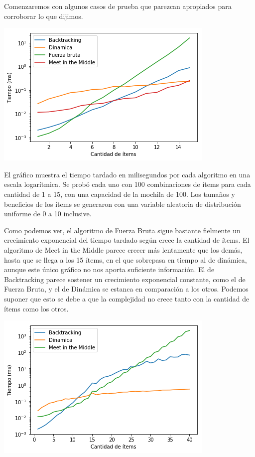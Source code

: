 \documentclass[10pt, a4paper]{article}
\begin{document}
Comenzaremos con algunos casos de prueba que parezcan apropiados para corroborar lo que dijimos.\par
\includegraphics{capacidad100.png}

El gráfico muestra el tiempo tardado en milisegundos por cada algoritmo en una escala logarítmica. Se probó cada uno con 100 combinaciones de ítems para cada cantidad de 1 a 15, con una capacidad de la mochila de 100. Los tamaños y beneficios de los ítems se generaron con una variable aleatoria de distribución uniforme de 0 a 10 inclusive.\par
Como podemos ver, el algoritmo de Fuerza Bruta sigue bastante fielmente un crecimiento exponencial del tiempo tardado según crece la cantidad de ítems. El algoritmo de Meet in the Middle parece crecer más lentamente que los demás, hasta que se llega a los 15 ítems, en el que sobrepasa en tiempo al de dinámica, aunque este único gráfico no nos aporta suficiente información. El de Backtracking parece sostener un crecimiento exponencial constante, como el de Fuerza Bruta, y el de Dinámica se estanca en comparación a los otros. Podemos suponer que esto se debe a que la complejidad no crece tanto con la cantidad de ítems como los otros.\par

\includegraphics{capacidad100sinfuerzahasta40.png}
\end{document}
